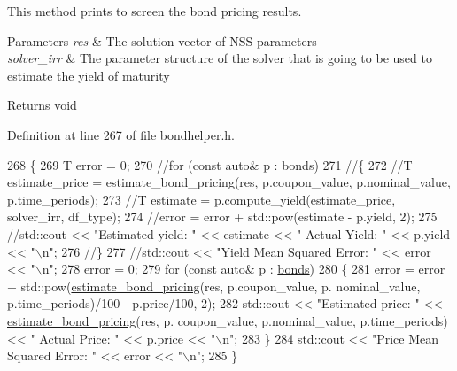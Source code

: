 This method prints to screen the bond pricing results. 


\begin{DoxyParams}{Parameters}
{\em res} & The solution vector of N\+SS parameters \\
\hline
{\em solver\+\_\+irr} & The parameter structure of the solver that is going to be used to estimate the yield of maturity \\
\hline
\end{DoxyParams}
\begin{DoxyReturn}{Returns}
void 
\end{DoxyReturn}


Definition at line 267 of file bondhelper.\+h.


\begin{DoxyCode}
268     \{
269         T error = 0;
270         \textcolor{comment}{//for (const auto& p : bonds)}
271         \textcolor{comment}{//\{}
272             \textcolor{comment}{//T estimate\_price = estimate\_bond\_pricing(res, p.coupon\_value, p.nominal\_value,
       p.time\_periods);}
273             \textcolor{comment}{//T estimate = p.compute\_yield(estimate\_price, solver\_irr, df\_type);}
274             \textcolor{comment}{//error = error + std::pow(estimate - p.yield, 2);}
275             \textcolor{comment}{//std::cout << "Estimated yield: " << estimate << " Actual Yield: " << p.yield << "\(\backslash\)n";}
276         \textcolor{comment}{//\}}
277         \textcolor{comment}{//std::cout << "Yield Mean Squared Error: " << error << "\(\backslash\)n";}
278         error = 0;
279         \textcolor{keywordflow}{for} (\textcolor{keyword}{const} \textcolor{keyword}{auto}& p : \hyperlink{classbond_1_1_bond_helper_a61db751f82d46ce2f7f5032ff2a3b03e}{bonds})
280         \{
281             error = error + std::pow(\hyperlink{classbond_1_1_bond_helper_a1288528021e7c60e3a1435d39ad8611d}{estimate\_bond\_pricing}(res, p.coupon\_value, p.
      nominal\_value, p.time\_periods)/100 - p.price/100, 2);
282             std::cout << \textcolor{stringliteral}{"Estimated price: "} << \hyperlink{classbond_1_1_bond_helper_a1288528021e7c60e3a1435d39ad8611d}{estimate\_bond\_pricing}(res, p.
      coupon\_value, p.nominal\_value, p.time\_periods) << \textcolor{stringliteral}{" Actual Price: "} << p.price << \textcolor{stringliteral}{"\(\backslash\)n"};
283         \}
284         std::cout << \textcolor{stringliteral}{"Price Mean Squared Error: "} << error << \textcolor{stringliteral}{"\(\backslash\)n"};
285     \}
\end{DoxyCode}
\mbox{\label{classbond_1_1_bond_helper_aaf31152498dbbf3704839a0c57e4555c}} 
